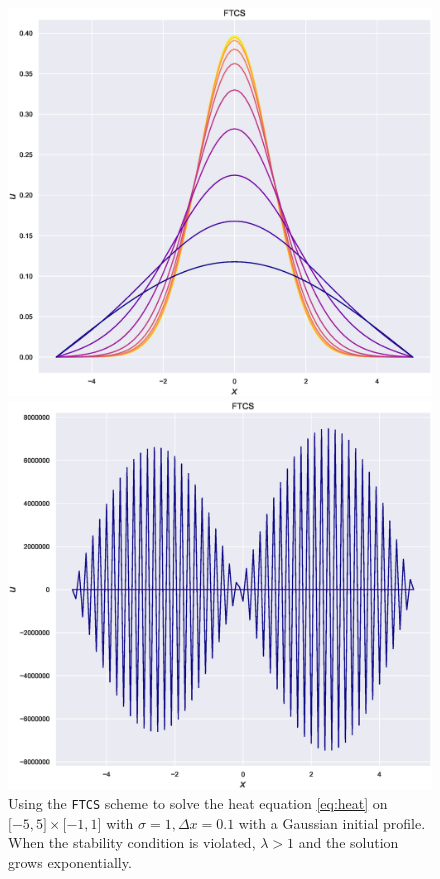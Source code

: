 \begin{figure}
    \centering
    \begin{minipage}[b]{0.49\textwidth}
        \centering
        \includegraphics[width=\textwidth]{Figures/stableFTCSheat.eps}
    \end{minipage} %
    \begin{minipage}[b]{0.49\textwidth}
        \centering
        \includegraphics[width=\textwidth]{Figures/unstableFTCSheat.eps}
    \end{minipage} %
    \caption[Instability in the FTCS scheme]{Using the \texttt{FTCS} scheme to solve the heat equation \eqref{eq:heat} on \( \lbrack -5,5\rbrack \times\lbrack -1,1\rbrack\) with \(\sigma =1, \Delta x = 0.1\) with a Gaussian initial profile. When the stability condition is violated, $\lambda>1$ and the solution grows exponentially.} 
    \label{fig:FTCSunstable}
\end{figure}

